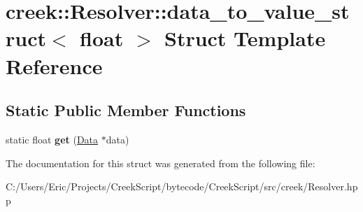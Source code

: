 \hypertarget{structcreek_1_1_resolver_1_1data__to__value__struct_3_01float_01_4}{}\section{creek\+:\+:Resolver\+:\+:data\+\_\+to\+\_\+value\+\_\+struct$<$ float $>$ Struct Template Reference}
\label{structcreek_1_1_resolver_1_1data__to__value__struct_3_01float_01_4}
\subsection*{Static Public Member Functions}
\begin{DoxyCompactItemize}
\item 
static float {\bfseries get} (\hyperlink{classcreek_1_1_data}{Data} $\ast$data)\hypertarget{structcreek_1_1_resolver_1_1data__to__value__struct_3_01float_01_4_a14b46abafbeaa67d88c662e8c5bf6aa9}{}\label{structcreek_1_1_resolver_1_1data__to__value__struct_3_01float_01_4_a14b46abafbeaa67d88c662e8c5bf6aa9}

\end{DoxyCompactItemize}


The documentation for this struct was generated from the following file\+:\begin{DoxyCompactItemize}
\item 
C\+:/\+Users/\+Eric/\+Projects/\+Creek\+Script/bytecode/\+Creek\+Script/src/creek/Resolver.\+hpp\end{DoxyCompactItemize}
